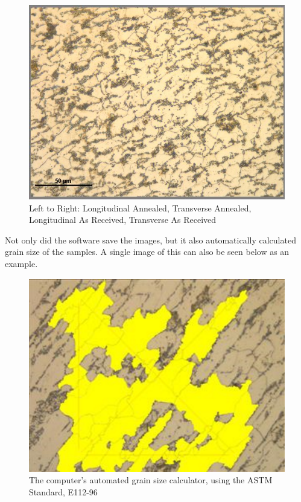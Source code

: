 \documentclass{article}
\begin{document}
\begin{figure}[h]
\begin{minipage}{0.24\textwidth}
	\end{minipage}
	\begin{minipage}{0.24\textwidth}
		\centering
		\includegraphics[scale=.21]{TARSteelGrains.jpg}
	\end{minipage}
	\caption{Left to Right: Longitudinal Annealed, Transverse Annealed, Longitudinal As Received, Transverse As Received}
\end{figure}

Not only did the software save the images, but it also automatically calculated grain size of the samples. A single image of this can also be seen below as an example.

\begin{figure}[h]
	\centering
	\includegraphics[scale=.4]{compLASteelGrains.png}
	\caption{The computer's automated grain size calculator, using the ASTM Standard, E112-96}
\end{figure}
\end{document}
